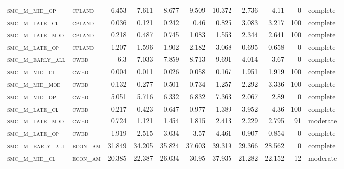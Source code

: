 \begin{landscape}
\begin{center}
\begin{footnotesize}
\begin{longtable}{llrrrrr|rrr}
\textsc{smc\_m\_mid\_op   } & \textsc{cpland    }   & 6.453    & 7.611    & 8.677    & 9.509    & 10.372   & 2.736       & 4.11          & 0             & complete     \\
\textsc{smc\_m\_late\_cl  } & \textsc{cpland    }   & 0.036    & 0.121    & 0.242    & 0.46     & 0.825    & 3.083       & 3.217         & 100           & complete \\
\textsc{smc\_m\_late\_mod } & \textsc{cpland    }   & 0.218    & 0.487    & 0.745    & 1.083    & 1.553    & 2.344       & 2.641         & 100           & complete \\
\textsc{smc\_m\_late\_op  } & \textsc{cpland    }   & 1.207    & 1.596    & 1.902    & 2.182    & 3.068    & 0.695       & 0.658         & 0             & complete     \\
\textsc{smc\_m\_early\_all} & \textsc{cwed      }   & 6.3      & 7.033    & 7.859    & 8.713    & 9.691    & 4.014       & 3.67          & 0             & complete     \\
\textsc{smc\_m\_mid\_cl   } & \textsc{cwed      }   & 0.004    & 0.011    & 0.026    & 0.058    & 0.167    & 1.951       & 1.919         & 100           & complete \\
\textsc{smc\_m\_mid\_mod  } & \textsc{cwed      }   & 0.132    & 0.277    & 0.501    & 0.734    & 1.257    & 2.292       & 3.336         & 100           & complete \\
\textsc{smc\_m\_mid\_op   } & \textsc{cwed      }   & 5.051    & 5.716    & 6.332    & 6.832    & 7.363    & 2.067       & 2.89          & 0             & complete     \\
\textsc{smc\_m\_late\_cl  } & \textsc{cwed      }   & 0.217    & 0.423    & 0.647    & 0.977    & 1.389    & 3.952       & 4.36          & 100           & complete \\
\textsc{smc\_m\_late\_mod } & \textsc{cwed      }   & 0.724    & 1.121    & 1.454    & 1.815    & 2.413    & 2.229       & 2.795         & 91            & moderate \\
\textsc{smc\_m\_late\_op  } & \textsc{cwed      }   & 1.919    & 2.515    & 3.034    & 3.57     & 4.461    & 0.907       & 0.854         & 0             & complete     \\
\textsc{smc\_m\_early\_all} & \textsc{econ\_am  }   & 31.849   & 34.205   & 35.824   & 37.603   & 39.319   & 29.366      & 28.562        & 0             & complete     \\
\textsc{smc\_m\_mid\_cl   } & \textsc{econ\_am  }   & 20.385   & 22.387   & 26.034   & 30.95    & 37.935   & 21.282      & 22.152        & 12            & moderate \\

\end{longtable}
\end{footnotesize}
\end{center}
\end{landscape}
